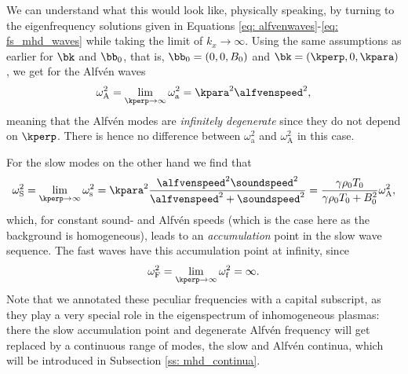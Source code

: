 We can understand what this would look like, physically speaking, by turning to the eigenfrequency solutions given in Equations \eqref{eq: alfvenwaves}-\eqref{eq: fs_mhd_waves} while taking the limit of $k_x \rightarrow \infty$. Using the same assumptions as earlier for $\bk$ and $\bb_0$, that is, $\bb_0 = (0, 0, B_0)$ and $\bk = (\kperp, 0, \kpara)$, we get for the Alfv\'en waves
\begin{equation} \label{eq: alfven_accumulation_point}
  \omega_\text{A}^2 = \lim_{\kperp \rightarrow \infty}\omega_\text{a}^2 = \kpara^2\alfvenspeed^2,
\end{equation}
meaning that the Alfv\'en modes are \emph{infinitely degenerate} since they do not depend on $\kperp$. There is hence no difference between $\omega_\text{a}^2$ and $\omega_\text{A}^2$ in this case.

For the slow modes on the other hand we find that
\begin{equation} \label{eq: slow_accumulation_point}
  \omega_\text{S}^2 =
    \lim_{\kperp \rightarrow \infty}\omega_\text{s}^2 =
    \kpara^2 \frac{\alfvenspeed^2 \soundspeed^2}{\alfvenspeed^2 + \soundspeed^2} =
    \frac{\gamma \rho_0 T_0}{\gamma \rho_0 T_0 + B_0^2}\omega_\text{A}^2,
\end{equation}
which, for constant sound- and Alfv\'en speeds (which is the case here as the background is homogeneous), leads to an \emph{accumulation} point in the slow wave sequence. The fast waves have this accumulation point at infinity, since
\begin{equation} \label{eq: fast_accumulation_point}
  \omega_\text{F}^2 = \lim_{\kperp \rightarrow \infty}\omega_\text{f}^2 = \infty.
\end{equation}
Note that we annotated these peculiar frequencies with a capital subscript, as they play a very special role in the eigenspectrum of inhomogeneous plasmas: there the slow accumulation point and degenerate Alfv\'en frequency will get replaced by a continuous range of modes, the slow and Alfv\'en continua, which will be introduced in Subsection \ref{ss: mhd_continua}.

